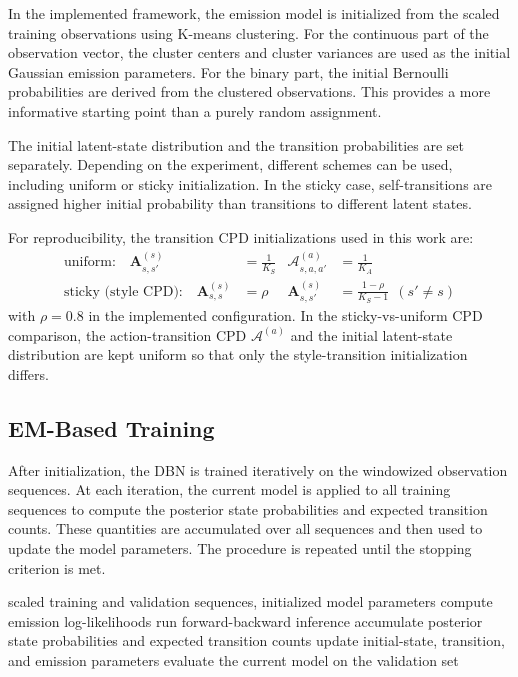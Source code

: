 \par In the implemented framework, the emission model is initialized from the scaled training observations using K-means clustering. 
For the continuous part of the observation vector, the cluster centers and cluster variances are used as the initial Gaussian emission parameters. 
For the binary part, the initial Bernoulli probabilities are derived from the clustered observations. 
This provides a more informative starting point than a purely random assignment.

\par The initial latent-state distribution and the transition probabilities are set separately.  
Depending on the experiment, different schemes can be used, including uniform or sticky initialization. 
In the sticky case, self-transitions are assigned higher initial probability than transitions to different latent states.

\par For reproducibility, the transition CPD initializations used in this work are:
\begin{align}
\text{uniform:}\quad \bm{A}^{(s)}_{s,s'} &= \frac{1}{K_S} & \mathcal{A}^{(a)}_{s,a,a'} &= \frac{1}{K_A} \\
\text{sticky (style CPD):}\quad \bm{A}^{(s)}_{s,s} &= \rho & \bm{A}^{(s)}_{s,s'} &= \frac{1-\rho}{K_S-1}\ \ (s'\neq s)
\end{align}
with \(\rho=0.8\) in the implemented configuration. In the sticky-vs-uniform CPD comparison, the action-transition CPD \(\mathcal{A}^{(a)}\) and the initial latent-state distribution are kept uniform so that only the style-transition initialization differs.


\subsection{EM-Based Training}
\label{subsec:em_training}
After initialization, the \ac{DBN} is trained iteratively on the windowized observation sequences. 
At each iteration, the current model is applied to all training sequences to compute the posterior state probabilities and expected transition counts.  
These quantities are accumulated over all sequences and then used to update the model parameters. 
The procedure is repeated until the stopping criterion is met.

\begin{algorithm}[htbp]
\caption{EM-based training procedure}
\label{alg:em_training}
\begin{algorithmic}[1]
\Require scaled training and validation sequences, initialized model parameters
\Repeat
        \State compute emission log-likelihoods
        \State run forward-backward inference
        \State accumulate posterior state probabilities and expected transition counts
    \EndFor
    \State update initial-state, transition, and emission parameters
    \State evaluate the current model on the validation set
\end{algorithmic}
\end{algorithm}

